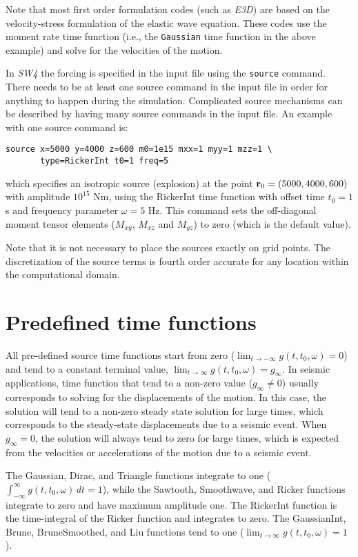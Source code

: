 \documentclass[11pt]{report}
\begin{document}
Note that most first order formulation codes (such as \emph{E3D}) are based on the velocity-stress
formulation of the elastic wave equation. These codes use the moment rate time function (i.e., the
{\tt Gaussian} time function in the above example) and solve for the velocities of the motion.

In \emph{SW4} the forcing is specified in the input file using the {\tt source} command. There needs
to be at least one source command in the input file in order for anything to happen during the
simulation. Complicated source mechanisms can be described by having many source commands in the
input file. An example with one source command is:
\begin{verbatim}
source x=5000 y=4000 z=600 m0=1e15 mxx=1 myy=1 mzz=1 \
       type=RickerInt t0=1 freq=5
\end{verbatim}
which specifies an isotropic source (explosion) at the point ${\bf r}_0=(5000,4000,600)$ with
amplitude $10^{15}$ Nm, using the RickerInt time function with offset time $t_0=1$ s and frequency
parameter $\omega=5$ Hz.  This command sets the off-diagonal moment tensor elements ($M_{xy}$,
$M_{xz}$ and $M_{yz}$) to zero (which is the default value).

Note that it is not necessary to place the sources exactly on grid points. The discretization of the
 source terms is fourth order accurate for any location within the computational domain.


\section{Predefined time functions}\label{sec:predefined}

All pre-defined source time functions start from zero ($\lim_{t\to -\infty} g(t,t_0,\omega) = 0$)
and tend to a constant terminal value, $\lim_{t\to \infty} g(t,t_0,\omega) = g_\infty$. In seismic
applications, time function that tend to a non-zero value ($g_\infty\ne 0$) usually corresponds to
solving for the displacements of the motion. In this case, the solution will tend to a non-zero
steady state solution for large times, which corresponds to the steady-state displacements due to a
seismic event. When $g_\infty = 0$, the solution will always tend to zero for large times, which is
expected from the velocities or accelerations of the motion due to a seismic event.

The Gaussian, Dirac, and Triangle functions integrate to one ($\int_{-\infty}^{\infty}
g(t,t_0,\omega) \, dt = 1$), while the Sawtooth, Smoothwave, and Ricker functions integrate to zero
and have maximum amplitude one. The RickerInt function is the time-integral of the Ricker function
and integrates to zero. The GaussianInt, Brune, BruneSmoothed, and Liu functions tend to one
($\lim_{t\to\infty} g(t,t_0,\omega) = 1$).
\end{document}
